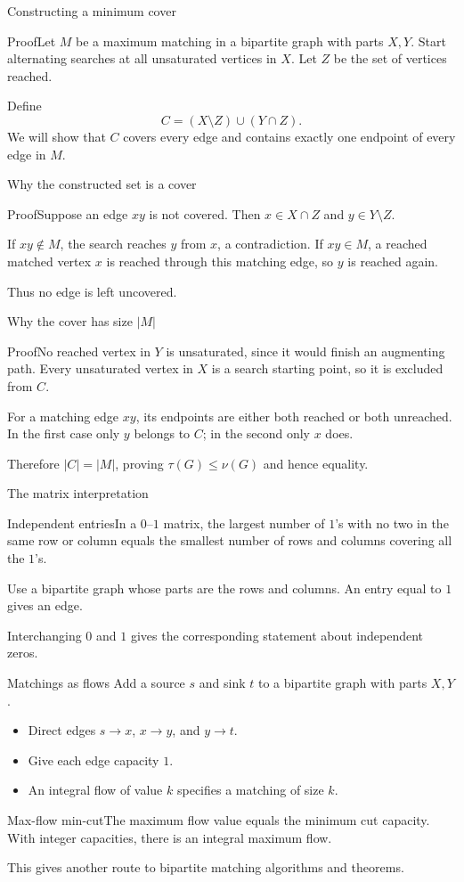 \documentclass[aspectratio=169,11pt]{beamer}
\newcommand{\Thm}[2]{\begin{block}{#1}#2\end{block}}
\renewcommand{\Proof}[1]{\begin{block}{Proof}\normalsize #1\end{block}}
\newcommand{\gap}{\par\medskip}
\begin{document}
\begin{frame}{Constructing a minimum cover}
\large
\Proof{Let $M$ be a maximum matching in a bipartite graph with parts $X,Y$. Start alternating searches at all unsaturated vertices in $X$. Let $Z$ be the set of vertices reached.\gap Define
\[C=(X\setminus Z)\cup(Y\cap Z).\]
We will show that $C$ covers every edge and contains exactly one endpoint of every edge in $M$.}
\end{frame}
\begin{frame}{Why the constructed set is a cover}
\large
\Proof{Suppose an edge $xy$ is not covered. Then $x\in X\cap Z$ and $y\in Y\setminus Z$.\gap If $xy\notin M$, the search reaches $y$ from $x$, a contradiction. If $xy\in M$, a reached matched vertex $x$ is reached through this matching edge, so $y$ is reached again.\gap Thus no edge is left uncovered.}
\end{frame}
\begin{frame}{Why the cover has size $|M|$}
\large
\Proof{No reached vertex in $Y$ is unsaturated, since it would finish an augmenting path. Every unsaturated vertex in $X$ is a search starting point, so it is excluded from $C$.\gap For a matching edge $xy$, its endpoints are either both reached or both unreached. In the first case only $y$ belongs to $C$; in the second only $x$ does.\gap Therefore $|C|=|M|$, proving $\tau(G)\leq\nu(G)$ and hence equality.}
\end{frame}
\begin{frame}{The matrix interpretation}
\large
\Thm{Independent entries}{In a $0$--$1$ matrix, the largest number of $1$'s with no two in the same row or column equals the smallest number of rows and columns covering all the $1$'s.}
\gap Use a bipartite graph whose parts are the rows and columns. An entry equal to $1$ gives an edge.
\gap Interchanging $0$ and $1$ gives the corresponding statement about independent zeros.
\end{frame}
\begin{frame}{Matchings as flows}
\large
\normalsize
Add a source $s$ and sink $t$ to a bipartite graph with parts $X,Y$.
\begin{itemize}
\item Direct edges $s\to x$, $x\to y$, and $y\to t$.
\item Give each edge capacity $1$.
\item An integral flow of value $k$ specifies a matching of size $k$.
\end{itemize}
\Thm{Max-flow min-cut}{The maximum flow value equals the minimum cut capacity. With integer capacities, there is an integral maximum flow.}
This gives another route to bipartite matching algorithms and theorems.
\end{frame}
\end{document}
